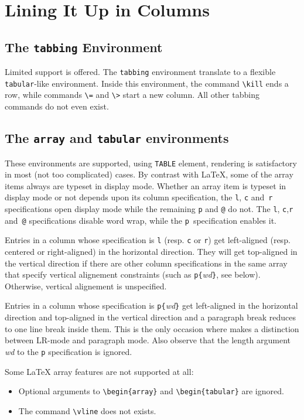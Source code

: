 \section{Lining It Up in Columns}
\subsection{The \protect\texttt{tabbing} Environment}
Limited support is offered.
The \texttt{tabbing} environment translate to a flexible \texttt{tabular}-like
environment.
Inside this environment, the command \verb+\kill+ ends a row, while
commands
\verb+\=+ and \verb+\>+ start a new column.
All other tabbing commands do not even exist.

\subsection{The \texttt{array} and \texttt{tabular}
environments}\label{arraydef}

These environments are supported, using \html{}
\verb+TABLE+ element, rendering is satisfactory in most (not too
complicated) cases.
By contrast with \LaTeX{},
some of the array items always are typeset in display mode.
Whether an array item is typeset in display mode or not depends upon
its column specification,
the \verb+l+, \verb+c+ and~\verb+r+ specifications open display mode
while the remaining \verb+p+ and \verb+@+ do not.
The \verb+l+, \verb+c+,\verb+r+ and~\verb+@+ specifications
disable word wrap, while the \verb+p+~specification enables it.

Entries in a column whose specification is \verb+l+ (resp. \verb+c+ or
\verb+r+) get left-aligned (resp. centered or right-aligned)
in the horizontal direction.
They will get top-aligned in the vertical direction if there are
other column specifications in the
same array that specify vertical alignement constraints
(such as \verb+p{+\textit{wd}\verb+}+, see below).
Otherwise, vertical alignement is unspecified.

Entries in a column whose specification is \verb+p{+{\it wd}\verb+}+
get left-aligned in the horizontal direction and
top-aligned in the vertical direction
and a paragraph break reduces to one line break inside them.
This is the only occasion where
\hevea{} makes a distinction between LR-mode and paragraph mode.
Also observe that the length argument \textit{wd} to the \verb+p+
specification is ignored.


Some \LaTeX{} array features are not supported at all:
\begin{itemize}
\item Optional arguments to \verb+\begin{array}+ and
\verb+\begin{tabular}+ are ignored.
\item The command \verb+\vline+ does not exists.
\end{itemize}

